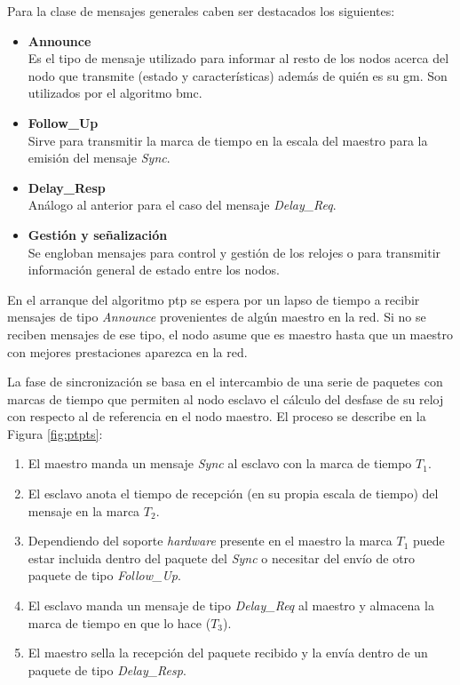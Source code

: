 Para la clase de mensajes generales caben ser destacados los siguientes:

\begin{itemize}
	\item \textbf{Announce} \\
	Es el tipo de mensaje utilizado para informar al resto de los nodos acerca 
	del nodo que transmite (estado y características) además de quién es su 
	\gls{gm}. Son utilizados por el algoritmo \gls{bmc}.
	
	\item \textbf{Follow\_Up} \\
	Sirve para transmitir la marca de tiempo en la escala del maestro para la 
	emisión del mensaje \textit{Sync}.
	
	\item \textbf{Delay\_Resp} \\
	Análogo al anterior para el caso del mensaje \textit{Delay\_Req}.
	
	\item \textbf{Gestión y señalización} \\
	Se engloban mensajes para control y gestión de los relojes o para 
	transmitir información general de estado entre los nodos.
	
\end{itemize}


En el arranque del algoritmo \gls{ptp} se espera por un lapso de tiempo a 
recibir mensajes de tipo \textit{Announce} provenientes de algún maestro en la 
red. Si no se reciben mensajes de ese tipo, el nodo asume que es maestro hasta 
que un maestro con mejores prestaciones aparezca en la red.

La fase de sincronización se basa en el intercambio de una serie de paquetes 
con marcas de tiempo que permiten al nodo esclavo el cálculo del desfase de su 
reloj con respecto al de referencia en el nodo maestro. El proceso se describe 
en la Figura \ref{fig:ptpts}:

\begin{enumerate}
	\item El maestro manda un mensaje \textit{Sync}  al esclavo con la marca de tiempo $T_1$.
	
	\item El esclavo anota el tiempo de recepción (en su propia escala de 
	tiempo) del mensaje en la marca $T_2$.
	
	\item Dependiendo del soporte \textit{hardware} presente en el maestro la 
	marca $T_1$ puede estar incluida dentro del paquete del \textit{Sync} o 
	necesitar del envío de otro paquete de tipo \textit{Follow\_Up}.
	
	\item El esclavo manda un mensaje de tipo \textit{Delay\_Req} al maestro y 
	almacena la marca de tiempo en que lo hace ($T_3$).
	
	\item El maestro sella la recepción del paquete recibido y la envía dentro 
	de un paquete de tipo \textit{Delay\_Resp}.
\end{enumerate}

